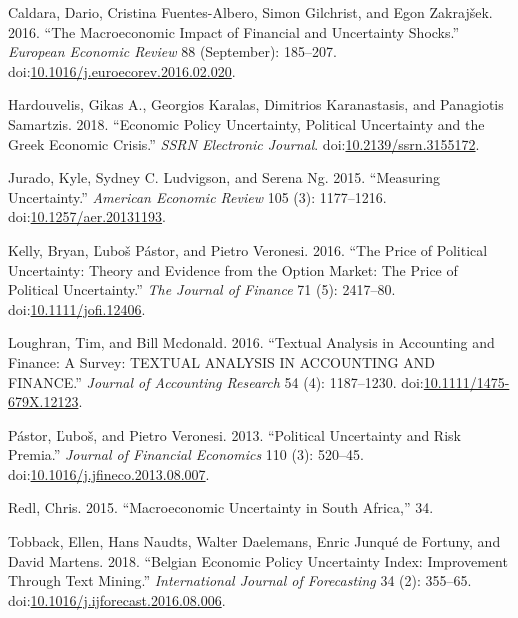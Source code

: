 \documentclass[11pt,preprint, authoryear]{elsarticle}
\numberwithin{equation}{section}
\numberwithin{figure}{section}
\numberwithin{table}{section}
\begin{document}
\hypertarget{ref-Caldara2016}{}
Caldara, Dario, Cristina Fuentes-Albero, Simon Gilchrist, and Egon
Zakrajšek. 2016. ``The Macroeconomic Impact of Financial and Uncertainty
Shocks.'' \emph{European Economic Review} 88 (September): 185--207.
doi:\href{https://doi.org/10.1016/j.euroecorev.2016.02.020}{10.1016/j.euroecorev.2016.02.020}.

\hypertarget{ref-Hardouvelis2018}{}
Hardouvelis, Gikas A., Georgios Karalas, Dimitrios Karanastasis, and
Panagiotis Samartzis. 2018. ``Economic Policy Uncertainty, Political
Uncertainty and the Greek Economic Crisis.'' \emph{SSRN Electronic
Journal}.
doi:\href{https://doi.org/10.2139/ssrn.3155172}{10.2139/ssrn.3155172}.

\hypertarget{ref-Jurado2015}{}
Jurado, Kyle, Sydney C. Ludvigson, and Serena Ng. 2015. ``Measuring
Uncertainty.'' \emph{American Economic Review} 105 (3): 1177--1216.
doi:\href{https://doi.org/10.1257/aer.20131193}{10.1257/aer.20131193}.

\hypertarget{ref-Kelly2016}{}
Kelly, Bryan, Ľuboš Pástor, and Pietro Veronesi. 2016. ``The Price of
Political Uncertainty: Theory and Evidence from the Option Market: The
Price of Political Uncertainty.'' \emph{The Journal of Finance} 71 (5):
2417--80.
doi:\href{https://doi.org/10.1111/jofi.12406}{10.1111/jofi.12406}.

\hypertarget{ref-Loughran2016}{}
Loughran, Tim, and Bill Mcdonald. 2016. ``Textual Analysis in Accounting
and Finance: A Survey: TEXTUAL ANALYSIS IN ACCOUNTING AND FINANCE.''
\emph{Journal of Accounting Research} 54 (4): 1187--1230.
doi:\href{https://doi.org/10.1111/1475-679X.12123}{10.1111/1475-679X.12123}.

\hypertarget{ref-Pastor2013}{}
Pástor, Ľuboš, and Pietro Veronesi. 2013. ``Political Uncertainty and
Risk Premia.'' \emph{Journal of Financial Economics} 110 (3): 520--45.
doi:\href{https://doi.org/10.1016/j.jfineco.2013.08.007}{10.1016/j.jfineco.2013.08.007}.

\hypertarget{ref-Redl2015}{}
Redl, Chris. 2015. ``Macroeconomic Uncertainty in South Africa,'' 34.

\hypertarget{ref-Tobback2018}{}
Tobback, Ellen, Hans Naudts, Walter Daelemans, Enric Junqué de Fortuny,
and David Martens. 2018. ``Belgian Economic Policy Uncertainty Index:
Improvement Through Text Mining.'' \emph{International Journal of
Forecasting} 34 (2): 355--65.
doi:\href{https://doi.org/10.1016/j.ijforecast.2016.08.006}{10.1016/j.ijforecast.2016.08.006}.




\end{document}
